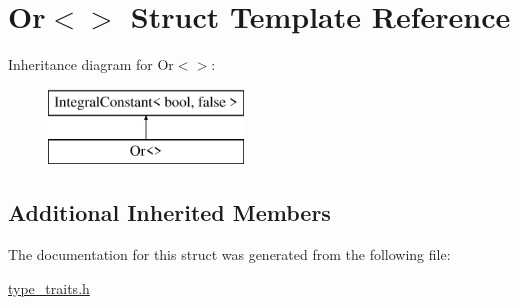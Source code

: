 \hypertarget{struct_or_3_4}{}\section{Or$<$$>$ Struct Template Reference}
\label{struct_or_3_4}
Inheritance diagram for Or$<$$>$\+:\begin{figure}[H]
\begin{center}
\leavevmode
\includegraphics[height=2.000000cm]{struct_or_3_4}
\end{center}
\end{figure}
\subsection*{Additional Inherited Members}


The documentation for this struct was generated from the following file\+:\begin{DoxyCompactItemize}
\item 
\hyperlink{type__traits_8h}{type\+\_\+traits.\+h}\end{DoxyCompactItemize}
